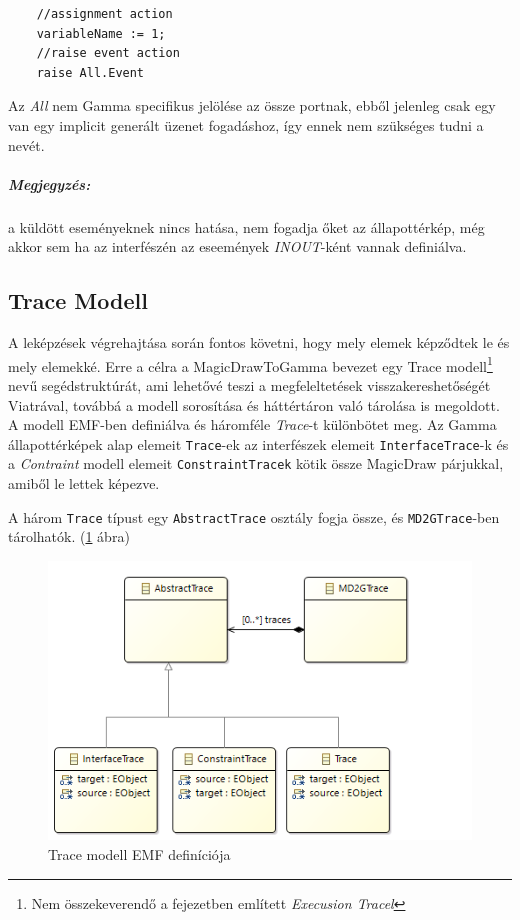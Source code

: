 \begin{lstlisting}
	//assignment action
	variableName := 1;
	//raise event action
	raise All.Event
\end{lstlisting}

Az \emph{All} nem Gamma specifikus jelölése az össze portnak, ebből jelenleg csak egy van egy implicit generált üzenet fogadáshoz, így ennek nem szükséges tudni a nevét.

\subparagraph{Megjegyzés:} a küldött eseményeknek nincs hatása, nem fogadja őket az állapottérkép, még akkor sem ha az interfészén az eseemények \emph{INOUT}-ként vannak definiálva.

\subsection{Trace Modell}
\label{sec:trace_model}
A leképzések végrehajtása során fontos követni, hogy mely elemek képződtek le és mely elemekké. Erre a célra a MagicDrawToGamma bevezet egy Trace modell\footnote{Nem összekeverendő a  fejezetben említett \emph{Execusion Tracel}} nevű segédstruktúrát, ami lehetővé teszi a megfeleltetések visszakereshetőségét Viatrával, továbbá a modell sorosítása és háttértáron való tárolása is megoldott. A modell EMF-ben definiálva és  háromféle \emph{Trace}-t különbötet meg. Az Gamma állapottérképek alap elemeit \verb+Trace+-ek az interfészek elemeit \verb+InterfaceTrace+-k és a \emph{Contraint} modell elemeit \verb+ConstraintTracek+ kötik össze MagicDraw párjukkal, amiből le lettek képezve.

A három \verb+Trace+ típust egy \verb+AbstractTrace+ osztály fogja össze, és \verb+MD2GTrace+-ben tárolhatók. (\ref{fig:trace-model} ábra)

\begin{figure}[ht]
	\centering
	\includegraphics[keepaspectratio, width=140mm]{figures/trace-model.png}
	\caption{Trace modell EMF definíciója}
	\label{fig:trace-model}
\end{figure}


